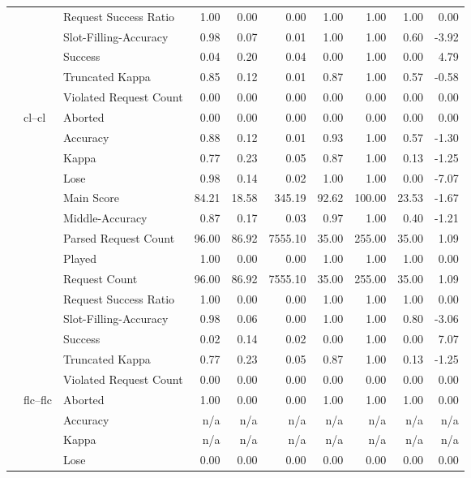 \begin{tabular}{lllrrrrrrr}
 &  & Request Success Ratio & 1.00 & 0.00 & 0.00 & 1.00 & 1.00 & 1.00 & 0.00 \\
 &  & Slot-Filling-Accuracy & 0.98 & 0.07 & 0.01 & 1.00 & 1.00 & 0.60 & -3.92 \\
 &  & Success & 0.04 & 0.20 & 0.04 & 0.00 & 1.00 & 0.00 & 4.79 \\
 &  & Truncated Kappa & 0.85 & 0.12 & 0.01 & 0.87 & 1.00 & 0.57 & -0.58 \\
 &  & Violated Request Count & 0.00 & 0.00 & 0.00 & 0.00 & 0.00 & 0.00 & 0.00 \\
\cline{2-10}
 & \multirow[t]{14}{*}{cl--cl} & Aborted & 0.00 & 0.00 & 0.00 & 0.00 & 0.00 & 0.00 & 0.00 \\
 &  & Accuracy & 0.88 & 0.12 & 0.01 & 0.93 & 1.00 & 0.57 & -1.30 \\
 &  & Kappa & 0.77 & 0.23 & 0.05 & 0.87 & 1.00 & 0.13 & -1.25 \\
 &  & Lose & 0.98 & 0.14 & 0.02 & 1.00 & 1.00 & 0.00 & -7.07 \\
 &  & Main Score & 84.21 & 18.58 & 345.19 & 92.62 & 100.00 & 23.53 & -1.67 \\
 &  & Middle-Accuracy & 0.87 & 0.17 & 0.03 & 0.97 & 1.00 & 0.40 & -1.21 \\
 &  & Parsed Request Count & 96.00 & 86.92 & 7555.10 & 35.00 & 255.00 & 35.00 & 1.09 \\
 &  & Played & 1.00 & 0.00 & 0.00 & 1.00 & 1.00 & 1.00 & 0.00 \\
 &  & Request Count & 96.00 & 86.92 & 7555.10 & 35.00 & 255.00 & 35.00 & 1.09 \\
 &  & Request Success Ratio & 1.00 & 0.00 & 0.00 & 1.00 & 1.00 & 1.00 & 0.00 \\
 &  & Slot-Filling-Accuracy & 0.98 & 0.06 & 0.00 & 1.00 & 1.00 & 0.80 & -3.06 \\
 &  & Success & 0.02 & 0.14 & 0.02 & 0.00 & 1.00 & 0.00 & 7.07 \\
 &  & Truncated Kappa & 0.77 & 0.23 & 0.05 & 0.87 & 1.00 & 0.13 & -1.25 \\
 &  & Violated Request Count & 0.00 & 0.00 & 0.00 & 0.00 & 0.00 & 0.00 & 0.00 \\
\cline{2-10}
 & \multirow[t]{13}{*}{flc--flc} & Aborted & 1.00 & 0.00 & 0.00 & 1.00 & 1.00 & 1.00 & 0.00 \\
 &  & Accuracy & n/a & n/a & n/a & n/a & n/a & n/a & n/a \\
 &  & Kappa & n/a & n/a & n/a & n/a & n/a & n/a & n/a \\
 &  & Lose & 0.00 & 0.00 & 0.00 & 0.00 & 0.00 & 0.00 & 0.00 \\

\end{tabular}
